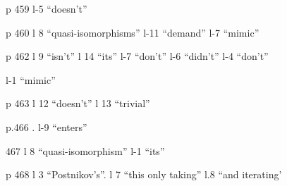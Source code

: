 p 459 l-5 ``doesn't''

p 460 l 8 ``quasi-isomorphisms'' \quad l-11 ``demand'' \quad l-7 ``mimic''

p 462 l 9 ``isn't'' \quad l 14 ``its'' \quad l-7 ``don't'' \quad l-6 ``didn't'' \quad l-4 ``don't''

l-1 ``mimic''

p 463 l 12 ``doesn't'' \quad l 13 ``trivial''

p.466 . l-9 ``enters''

467 l 8 ``quasi-isomorphism'' \quad l-1 ``its''

p 468 l 3 ``Postnikov's''. \quad l 7 ``this only taking'' \quad l.8 ``and iterating'
